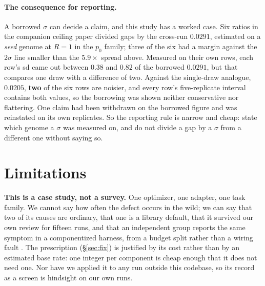 \documentclass[11pt]{article}
\begin{document}
\paragraph{The consequence for reporting.}
A borrowed $\sigma$ can decide a claim, and this study has a worked case. Six ratios in the
companion ceiling paper divided gaps by the cross-run $0.0291$, estimated on a \emph{seed}
genome at $R{=}1$ in the $p_0$ family; three of the six had a margin against the $2\sigma$ line
smaller than the $5.9\times$ spread above. Measured on their own rows, each row's sd came out
between $0.38$ and $0.82$ of the borrowed $0.0291$, but that compares one draw with a difference
of two. Against the single-draw analogue, $0.0205$, \textbf{two} of the six rows are noisier, and
every row's five-replicate interval contains both values, so the borrowing was shown neither
conservative nor flattering. One claim had been withdrawn on the borrowed figure and was reinstated
on its own replicates. So the reporting rule is
narrow and cheap: state which genome a $\sigma$ was measured on, and do not divide a gap by a
$\sigma$ from a different one without saying so.

\section{Limitations}
\label{sec:threats}

\textbf{This is a case study, not a survey.} One optimizer, one adapter, one task family. We
cannot say how often the defect occurs in the wild; we can say that two of its causes are
ordinary, that one is a library default, that it survived our own review for fifteen runs, and
that an independent group reports the same symptom in a componentized harness, from a budget
split rather than a wiring fault \citep{nguyen2026harnessevo}. The
prescription (\S\ref{sec:fix}) is justified by its cost rather than by an estimated base rate:
one integer per component is cheap enough that it does not need one. Nor have we applied it to any
run outside this codebase, so its record as a screen is hindsight on our own runs.
\end{document}
